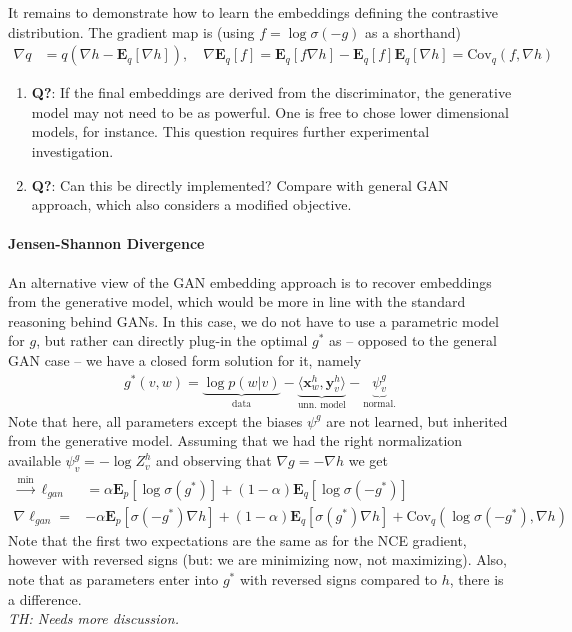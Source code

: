 \documentclass{article}
\newcommand{\E}{{\mathbf E}}
\newcommand{\x}{{\mathbf x}}
\newcommand{\y}{{\mathbf y}}
\begin{document}
It remains to demonstrate how to learn the embeddings defining the contrastive distribution. The gradient map is (using $f=\log \sigma(-g)$ as a shorthand) 
\begin{align}
\nabla  q & = 
q  \left( \nabla h- \E_q\left[ \nabla h \right] \right), \quad 
\nabla \E_q[f] = \E_q\left[ f \nabla h \right] - \E_q\left[ f\right] \E_q\left[ \nabla h\right] = \text{Cov}_q\left(f, \nabla h\right)
\label{eq:gan-grad}
\end{align}
\begin{enumerate}
\item \textbf{Q?}: If the final embeddings are derived from the discriminator, the generative model may not need to be as powerful. One is free to chose lower dimensional models, for instance. This question requires further experimental investigation. 
\item \textbf{Q?}: Can this be directly implemented? Compare with general GAN approach, which also considers a modified objective. 
\end{enumerate}

\paragraph{Jensen-Shannon Divergence} An alternative view of the GAN embedding approach is to recover embeddings from the generative model, which would be more in line with the standard reasoning behind GANs. In this case, we do not have to use a parametric model for $g$, but rather can directly plug-in the optimal $g^*$ as -- opposed to the general GAN case -- we have a closed form solution for it, namely 
\begin{align}
g^*(v,w) = \underbrace{\log p(w|v)}_{\text{data}} - \underbrace{\langle \x^h_w, \y_v^h \rangle}_{\text{unn.~model}} -  \underbrace{\psi_v^g}_{\text{normal.}}
\end{align}
Note that here, all parameters except the biases $\psi^g$ are not learned, but inherited from the generative model. Assuming that we had the right normalization available $\psi_v^g = -\log Z_v^h$ and observing that $\nabla g = - \nabla h$ we get
\begin{align}
\stackrel \min \rightarrow \ell_{gan} & = 
\alpha \E_p[\log \sigma(g^*)] + (1-\alpha) \E_q[\log \sigma(-g^*)] \\
 \nabla \ell_{gan} = & 
- \alpha \E_p[\sigma(-g^*) \nabla h]  +  (1-\alpha) \E_q\left[ \sigma(g^*) \nabla h\right] + \text{Cov}_q(\log \sigma(-g^*),\nabla h)
\end{align}
Note that the first two expectations are the same as for the NCE gradient, however with reversed signs (but: we are minimizing now, not maximizing). Also, note that as parameters enter into $g^*$ with reversed signs compared to $h$, there is a difference. \\

\textit{TH: Needs more discussion.}



\end{document}
